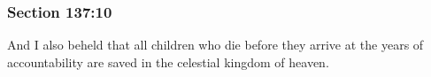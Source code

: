	\subsubsection{Section 137:10} %
		\label{DC137-10}

		And I also beheld that all children who die before they arrive at the years of accountability are saved in the celestial kingdom of heaven.

